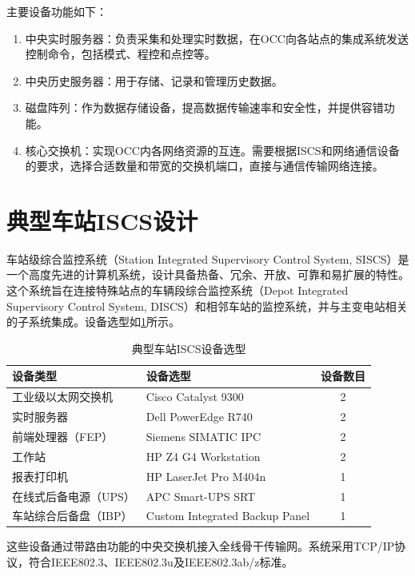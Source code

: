 主要设备功能如下：

\begin{enumerate}
	\item 中央实时服务器：负责采集和处理实时数据，在OCC向各站点的集成系统发送控制命令，包括模式、程控和点控等。
	\item 中央历史服务器：用于存储、记录和管理历史数据。
	\item 磁盘阵列：作为数据存储设备，提高数据传输速率和安全性，并提供容错功能。
	\item 核心交换机：实现OCC内各网络资源的互连。需要根据ISCS和网络通信设备的要求，选择合适数量和带宽的交换机端口，直接与通信传输网络连接。
\end{enumerate}

\section{典型车站ISCS设计}

车站级综合监控系统（Station Integrated Supervisory Control System, SISCS）是一个高度先进的计算机系统，设计具备热备、冗余、开放、可靠和易扩展的特性。这个系统旨在连接特殊站点的车辆段综合监控系统（Depot Integrated Supervisory Control System, DISCS）和相邻车站的监控系统，并与主变电站相关的子系统集成。设备选型如\ref{典型车站ISCS设备选型}所示。
\begin{table}[h]
	\caption{典型车站ISCS设备选型}
	\label{典型车站ISCS设备选型}
	\centering
	\begin{tabular}{|l|l|c|}
		
		\hline
		\textbf{设备类型} & \textbf{设备选型} & \textbf{设备数目} \\
		\hline
		工业级以太网交换机 & Cisco Catalyst 9300 & 2 \\
		\hline
		实时服务器 & Dell PowerEdge R740 & 2 \\
		\hline
		前端处理器（FEP） & Siemens SIMATIC IPC & 2 \\
		\hline
		工作站 & HP Z4 G4 Workstation & 2 \\
		\hline
		报表打印机 & HP LaserJet Pro M404n & 1 \\
		\hline
		在线式后备电源（UPS） & APC Smart-UPS SRT & 1 \\
		\hline
		车站综合后备盘（IBP） & Custom Integrated Backup Panel & 1 \\
		\hline
	\end{tabular}
\end{table}



这些设备通过带路由功能的中央交换机接入全线骨干传输网。系统采用TCP/IP协议，符合IEEE802.3、IEEE802.3u及IEEE802.3ab/z标准。

